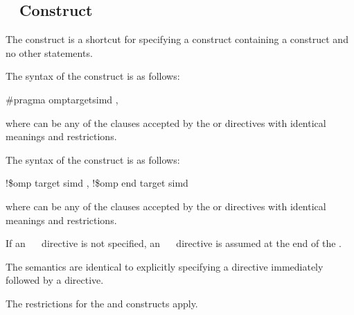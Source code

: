{{{{\subsection{~ Construct}
\label{subsec:target simd Construct}

\summary
The   construct is a shortcut for specifying a  
construct containing a  construct and no other statements.

\syntax
\ccppspecificstart
The syntax of the   construct is as follows:

\begin{boxedcode}
\#pragma omp\plc{ }target\plc{ }simd \plc{[clause[ [},\plc{] clause] ... ] new-line}
\end{boxedcode}

where  can be any of the clauses accepted by the  or
 directives with identical meanings and restrictions.

\ccppspecificend

\begin{samepage}
\fortranspecificstart
The syntax of the   construct is as follows:

\begin{boxedcode}
!\$omp target simd \plc{[clause[ [},\plc{] clause] ... ]}
\plc{[}!\$omp end target simd\plc{]}
\end{boxedcode}
\end{samepage}

where  can be any of the clauses accepted by the  or 
 directives with identical meanings and restrictions.

If an ~~ directive is not specified, an 
~~ directive is assumed at the end of 
the .
\fortranspecificend

\descr
The semantics are identical to explicitly specifying a  directive 
immediately followed by a  directive. 

\restrictions

The restrictions for the  and  constructs apply.

}}}}
